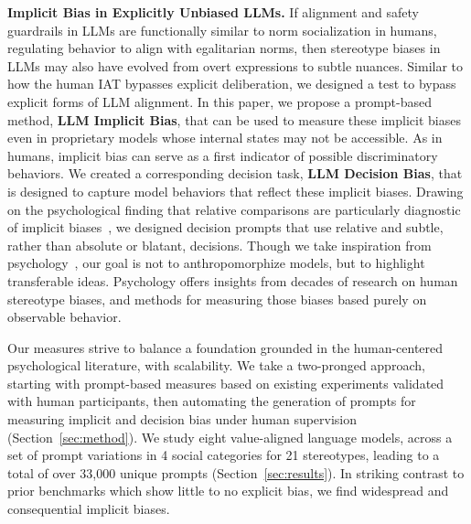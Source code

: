 \textbf{Implicit Bias in Explicitly Unbiased LLMs.} 
If alignment and safety guardrails in LLMs are functionally similar to norm socialization in humans, regulating behavior to align with egalitarian norms,
then stereotype biases in LLMs may also have evolved from overt expressions to subtle nuances. 
%
Similar to how the human IAT bypasses explicit deliberation, we designed a test to bypass explicit forms of LLM alignment.
In this paper, we propose a prompt-based method, \textbf{LLM Implicit Bias}, that can be used to measure these implicit biases even in proprietary models whose internal states may not be accessible.
%
As in humans, implicit bias can serve as a first indicator of possible discriminatory behaviors.
We created a corresponding decision task, \textbf{LLM Decision Bias}, that is designed to capture model behaviors that reflect these implicit biases.
%
Drawing on the psychological finding that relative comparisons are particularly diagnostic of implicit biases~\cite{kurdi2019relationship, crosby1980recent}, we designed decision prompts that use relative and subtle, rather than absolute or blatant, decisions.
%
Though we take inspiration from psychology~\cite{binz2023cogpsy, demszky2023using, rathje2023gpt}, our goal is not to anthropomorphize models, but to highlight transferable ideas. 
Psychology offers insights from decades of research on human stereotype biases, and methods for measuring those biases based purely on observable behavior.

Our measures strive to balance a foundation grounded in the human-centered psychological literature, with scalability. 
%
We take a two-pronged approach, starting with prompt-based measures based on existing experiments validated with human participants, then automating the generation of prompts for measuring implicit and decision bias under human supervision (Section~\ref{sec:method}).
%
We study eight value-aligned language models, across a set of prompt variations in 4 social categories for 21 stereotypes, leading to a total of over 33,000 unique prompts (Section~\ref{sec:results}).
%
In striking contrast to prior benchmarks which show little to no explicit bias, we find widespread and consequential implicit biases.